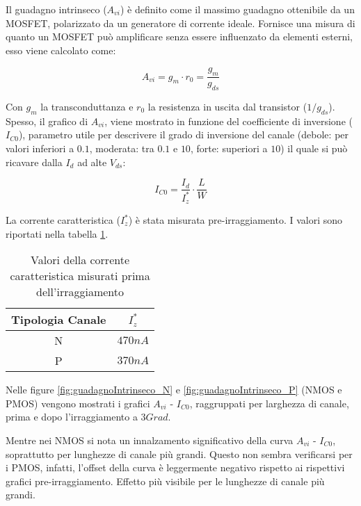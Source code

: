 Il guadagno intrinseco ($A_{vi}$) è definito come il massimo guadagno ottenibile da un MOSFET, polarizzato da un generatore di corrente ideale. Fornisce una misura di quanto un MOSFET può amplificare senza essere influenzato da elementi esterni, esso viene calcolato come:

$$A_{vi} = g_{m} \cdot r_0 = \frac{g_{m}}{g_{ds}} $$

Con $g_m$ la transconduttanza e $r_0$ la resistenza in uscita dal transistor (${1}/{g_{ds}}$). Spesso, il grafico di $A_{vi}$, viene mostrato in funzione del coefficiente di inversione ($I_{C0}$), parametro utile per descrivere il grado di inversione del canale (debole: per valori inferiori a $0.1$, moderata: tra $0.1$ e $10$, forte: superiori a $10$) il quale si può ricavare dalla $I_d$ ad alte $V_{ds}$:

$$I_{C0} = \frac{I_{d}}{I_{z}^{*}} \cdot \frac{L}{W}$$

La corrente caratteristica ($I_{z}^{*}$) è stata misurata pre-irraggiamento. I valori sono riportati nella tabella \ref{tab:corrente_caratteristica}.

\begin{table}[ht]
    \centering
    \begin{tabular}{c c}
        \toprule
        Tipologia Canale & $I_{z}^{*}$ \\
        \midrule
        N                & $470nA$     \\
        P                & $370nA$     \\
        \bottomrule
    \end{tabular}
    \caption{Valori della corrente caratteristica misurati prima dell'irraggiamento}
    \label{tab:corrente_caratteristica}
\end{table}


Nelle figure \ref{fig:guadagnoIntrinseco_N} e \ref{fig:guadagnoIntrinseco_P} (NMOS e PMOS) vengono mostrati i grafici $A_{vi}$ - $I_{C0}$, raggruppati per larghezza di canale, prima e dopo l'irraggiamento a $3Grad$.

Mentre nei NMOS si nota un innalzamento significativo della curva $A_{vi}$ - $I_{C0}$, soprattutto per lunghezze di canale più grandi. Questo non sembra verificarsi per i PMOS, infatti, l'offset della curva è leggermente negativo rispetto ai rispettivi grafici pre-irraggiamento. Effetto più visibile per le lunghezze di canale più grandi.


